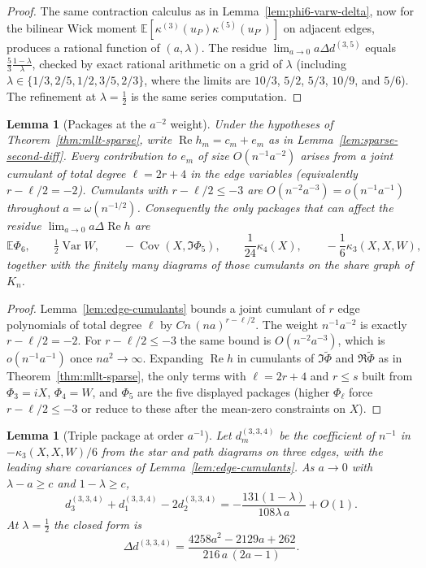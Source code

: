 \documentclass[11pt]{article}
\newtheorem{lemma}[theorem]{Lemma}
\newcommand{\EE}{\mathbb{E}}
\begin{document}
\begin{proof}
The same contraction calculus as in Lemma~\ref{lem:phi6-varw-delta}, now for
the bilinear Wick moment \(\EE[\kappa^{(3)}(u_P)\kappa^{(5)}(u_{P'})]\) on
adjacent edges, produces a rational function of \((a,\lambda)\). The residue
\(\lim_{a\to0}a\Delta d^{(3,5)}\) equals \(\frac5{3}\frac{1-\lambda}{\lambda}\),
checked by exact rational arithmetic on a grid of \(\lambda\) (including
\(\lambda\in\{1/3,2/5,1/2,3/5,2/3\}\), where the limits are \(10/3\), \(5/2\),
\(5/3\), \(10/9\), and \(5/6\)). The refinement at \(\lambda=\tfrac12\) is the
same series computation.
\end{proof}

\begin{lemma}[Packages at the \(a^{-2}\) weight]
\label{lem:a-minus-two-class}
Under the hypotheses of Theorem~\ref{thm:mllt-sparse}, write
\(\operatorname{Re}h_m=c_m+e_m\) as in Lemma~\ref{lem:sparse-second-diff}.
Every contribution to \(e_m\) of size \(O(n^{-1}a^{-2})\) arises from a joint
cumulant of total degree \(\ell=2r+4\) in the edge variables (equivalently
\(r-\ell/2=-2\)). Cumulants with \(r-\ell/2\le-3\) are
\(O(n^{-2}a^{-3})=o(n^{-1}a^{-1})\) throughout \(a=\omega(n^{-1/2})\).
Consequently the only packages that can affect the residue
\(\lim_{a\to0}a\Delta\operatorname{Re}h\) are
\[
\EE\Phi_6,\qquad
\tfrac12\operatorname{Var}W,\qquad
-\operatorname{Cov}(X,\Im\Phi_5),\qquad
\frac1{24}\kappa_4(X),\qquad
-\frac1{6}\kappa_3(X,X,W),
\]
together with the finitely many diagrams of those cumulants on the share graph
of \(K_n\).
\end{lemma}

\begin{proof}
Lemma~\ref{lem:edge-cumulants} bounds a joint cumulant of \(r\) edge
polynomials of total degree \(\ell\) by \(Cn\,(na)^{r-\ell/2}\). The weight
\(n^{-1}a^{-2}\) is exactly \(r-\ell/2=-2\). For \(r-\ell/2\le-3\) the same
bound is \(O(n^{-2}a^{-3})\), which is \(o(n^{-1}a^{-1})\) once
\(na^2\to\infty\). Expanding
\(\operatorname{Re}h\) in cumulants of \(\Im\tilde\Phi\) and \(\Re\tilde\Phi\)
as in Theorem~\ref{thm:mllt-sparse}, the only terms with \(\ell=2r+4\) and
\(r\le s\) built from \(\Phi_3=iX\), \(\Phi_4=W\), and \(\Phi_5\) are the five
displayed packages (higher \(\Phi_{\ell}\) force \(r-\ell/2\le-3\) or reduce to
these after the mean-zero constraints on \(X\)).
\end{proof}

\begin{lemma}[Triple package at order \(a^{-1}\)]
\label{lem:k3xxw-delta}
Let \(d_m^{(3,3,4)}\) be the coefficient of \(n^{-1}\) in
\(-\kappa_3(X,X,W)/6\) from the star and path diagrams on three edges, with
the leading share covariances of Lemma~\ref{lem:edge-cumulants}.
As \(a\to0\) with \(\lambda-a\ge c\) and \(1-\lambda\ge c\),
\[
d_3^{(3,3,4)}+d_1^{(3,3,4)}-2d_2^{(3,3,4)}
=
-\frac{131(1-\lambda)}{108\lambda\,a}+O(1).
\]
At \(\lambda=\tfrac12\) the closed form is
\[
\Delta d^{(3,3,4)}
=
\frac{4258a^2-2129a+262}{216\,a\,(2a-1)}.
\]
\end{lemma}
\end{document}
